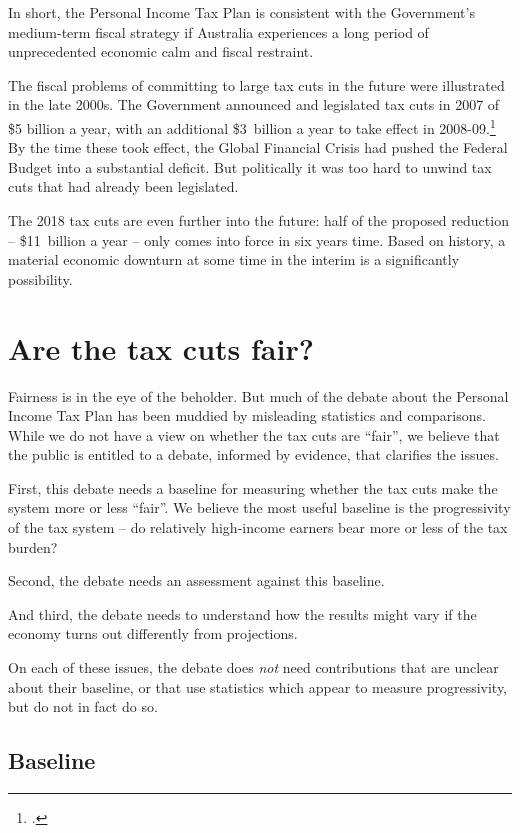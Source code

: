 \documentclass[submission]{grattan}\usepackage[]{graphicx}\usepackage[]{color}
\begin{document}
In short, the Personal Income Tax Plan is consistent with the Government's medium-term fiscal strategy if Australia experiences a long period of unprecedented economic calm and fiscal restraint.

The fiscal problems of committing to large tax cuts in the future were illustrated in the late 2000s. The Government announced and legislated tax cuts in 2007 of \$5 billion a year, with an additional \$3~billion a year to take effect in 2008-09.\footcite[][3]{Treasury2007}
By the time these took effect, the Global Financial Crisis had pushed the Federal Budget into a substantial deficit. But politically it was too hard to unwind tax cuts that had already been legislated.

The 2018 tax cuts are even further into the future: half of the proposed reduction -- \$11~billion a year -- only comes into force in six years time. Based on history, a material economic downturn at some time in the interim is a significantly possibility. 


\chapter{Are the tax cuts fair?}\label{chap:are-the-tax-cuts-fair}

Fairness is in the eye of the beholder. But much of the debate about the Personal Income Tax Plan has been muddied by misleading statistics and comparisons. While we do not have a view on whether the tax cuts are ``fair'', we believe that the public is entitled to a debate, informed by evidence, that clarifies the issues.

First, this debate needs a baseline for measuring whether the tax cuts make the system more or less ``fair''. We believe the most useful baseline is the progressivity of the tax system -- do relatively high-income earners bear more or less of the tax burden?

Second, the debate needs an assessment against this baseline.

And third, the debate needs to understand how the results might vary if the economy turns out differently from projections.

On each of these issues, the debate does \emph{not} need contributions that are unclear about their baseline, or that use statistics which appear to measure progressivity, but do not in fact do so.

\section{Baseline}\label{sec:baseline}
\end{document}
